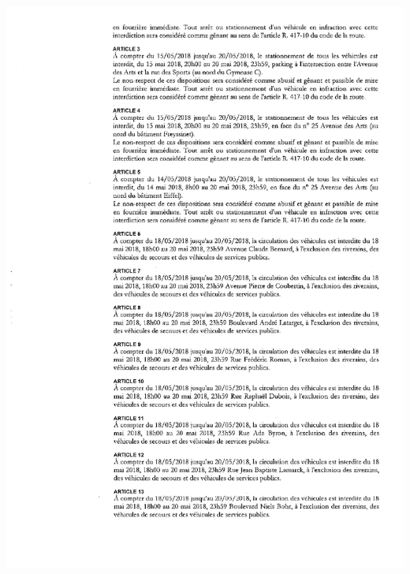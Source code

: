 \documentclass[hidelinks, paper=a4, fontsize=13pt]{report}
\begin{document}
\begin{center}
\includegraphics[scale = 0.7]{Annexes/Documents/VilleurbanneCirculation2}

\end{center}
\end{document}
